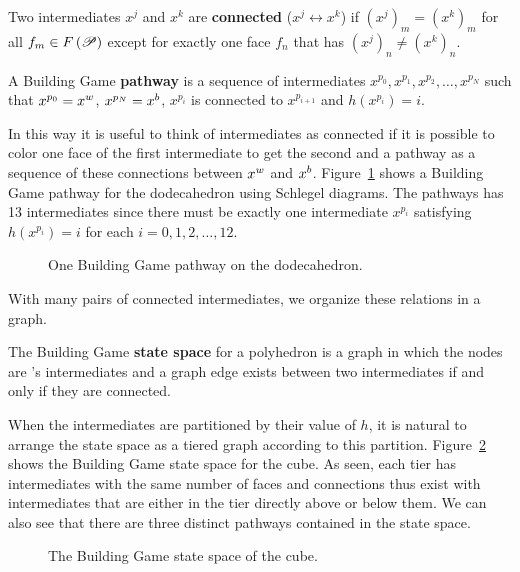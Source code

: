 \begin{mydef}
Two intermediates $x^j$ and $x^k$ are \textbf{connected} ($x^j \leftrightarrow x^k$) if $\left(x^j\right)_m = \left(x^k\right)_m$ for all $f_m \in F\left(\mathscr{P}\right)$ except for exactly one face $f_n$ that has  $\left(x^j\right)_n \neq \left(x^k\right)_n$.
\end{mydef}
\begin{mydef}
A Building Game \textbf{pathway} is a sequence of intermediates $x^{p_0}, x^{p_1}, x^{p_2}, \dots, x^{p_N}$ such that $x^{p_0} = x^w$, $x^{p_N} = x^b$, $x^{p_i}$ is connected to $x^{p_{i+1}}$ and $h\left(x^{p_i}\right) = i$.
\end{mydef}

In this way it is useful to think of intermediates as connected if it is possible to color one face of the first intermediate to get the second and a pathway as a sequence of these connections between $x^w$ and $x^b$. Figure~\ref{fig:DodecBG} shows a Building Game pathway for the dodecahedron using Schlegel diagrams. The pathways has 13 intermediates since there must be exactly one intermediate $x^{p_i}$ satisfying $h\left(x^{p_i}\right) = i$ for each $i = 0,1,2,\dots,12$.

\begin{figure}[ht]
\caption{One Building Game pathway on the dodecahedron.}
\label{fig:DodecBG}
\end{figure}

With many pairs of connected intermediates, we organize these relations in a graph.

\begin{mydef}
The Building Game \textbf{state space} for a polyhedron \poly\spc is a graph in which the nodes are \poly's intermediates and a graph edge exists between two intermediates if and only if they are connected. 
\end{mydef}

When the intermediates are partitioned by their value of $h$, it is natural to arrange the state space as a tiered graph according to this partition. Figure~\ref{fig:CubeSS} shows the Building Game state space for the cube. As seen, each tier has intermediates with the same number of  faces and connections thus exist with intermediates that are either in the tier directly above or below them. We can also see that there are three distinct pathways contained in the state space. 

\begin{figure}[ht]
\caption{The Building Game state space of the cube.}
\label{fig:CubeSS}    
\end{figure}

